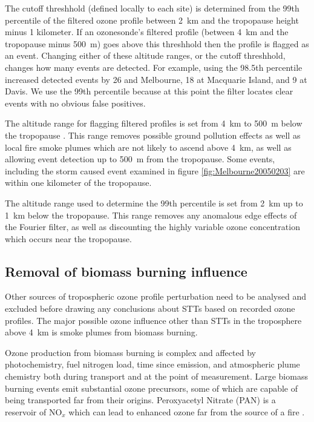 \documentclass{article}
\begin{document}
    The cutoff threshhold (defined locally to each site) is determined from the 99th percentile of the filtered ozone profile between 2~km and the tropopause height minus 1 kilometer.
    If an ozonesonde's filtered profile (between 4~km and the tropopause minus 500~m) goes above this threshhold then the profile is flagged as an event.
    Changing either of these altitude ranges, or the cutoff threshhold, changes how many events are detected.
    For example, using the 98.5th percentile increased detected events by 26 and Melbourne, 18 at Macquarie Island, and 9 at Davis.
    We use the 99th percentile because at this point the filter locates clear events with no obvious false positives.
    
    The altitude range for flagging filtered profiles is set from 4~km to 500~m below the tropopause .
    This range removes possible ground pollution effects as well as local fire smoke plumes which are not likely to ascend above 4~km, as well as allowing event detection up to 500~m from the tropopause.
    Some events, including the storm caused event examined in figure \ref{fig:Melbourne20050203} are within one kilometer of the tropopause. 
    
    The altitude range used to determine the 99th percentile is set from 2~km up to 1~km below the tropopause.
    This range removes any anomalous edge effects of the Fourier filter, as well as discounting the highly variable ozone concentration which occurs near the tropopause.
    
  \subsection{Removal of biomass burning influence}
  
    
    Other sources of tropospheric ozone profile perturbation need to be analysed and excluded before drawing any conclusions about STTs based on recorded ozone profiles. 
    The major possible ozone influence other than STTs in the troposphere above 4~km is smoke plumes from biomass burning.
    
    Ozone production from biomass burning is complex and affected by photochemistry, fuel nitrogen load, time since emission, and atmospheric plume chemistry both during transport and at the point of measurement.
    Large biomass burning events emit substantial ozone precursors, some of which are capable of being transported far from their origins. 
    Peroxyacetyl Nitrate (PAN) is a reservoir of NO$_x$ which can lead to enhanced ozone far from the source of a fire \citep{Jaffe_2012}.
    
\end{document}
